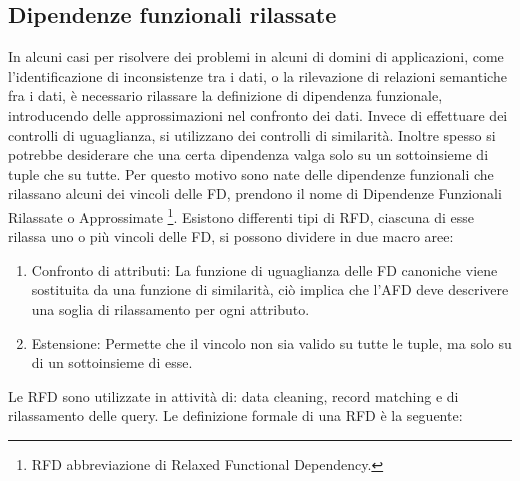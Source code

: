 \subsection{Dipendenze funzionali rilassate}
In alcuni casi per risolvere dei problemi in alcuni di domini di applicazioni, come l’identificazione di inconsistenze tra i dati, o la rilevazione di relazioni semantiche fra i dati,  è necessario rilassare la definizione di dipendenza funzionale, introducendo delle approssimazioni nel confronto dei dati. Invece di effettuare dei controlli di uguaglianza, si utilizzano dei controlli di similarità.
Inoltre spesso si potrebbe desiderare che una certa dipendenza valga solo su un sottoinsieme di tuple che su tutte.
Per questo motivo sono nate delle dipendenze funzionali che rilassano alcuni dei vincoli delle FD, prendono il nome di Dipendenze Funzionali Rilassate o Approssimate \footnote{RFD abbreviazione di Relaxed Functional Dependency.}.
Esistono differenti tipi di RFD, ciascuna di esse rilassa uno o più vincoli delle FD, si possono dividere in due macro aree:
\begin{enumerate}
	\item Confronto di attributi: La funzione di uguaglianza delle FD canoniche viene sostituita da una funzione di similarità, ciò implica che l'AFD deve descrivere una soglia di rilassamento per ogni attributo.
	\item Estensione: Permette che il vincolo non sia valido su tutte le tuple, ma solo su di un sottoinsieme di esse.
\end{enumerate}
Le RFD sono utilizzate in attività di:
data cleaning, record matching e di rilassamento delle query.
Le definizione formale di una RFD è la seguente:
